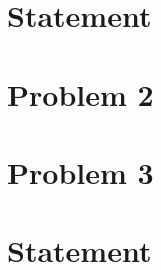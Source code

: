 \documentclass{article}
\numberwithin{equation}{section} %
\numberwithin{figure}{section} %
\begin{document}

\section{Statement}  %
\newpage \section{Problem 2}  %
\newpage \section{Problem 3}  %
\newpage \section{Statement}  %
\end{document}

